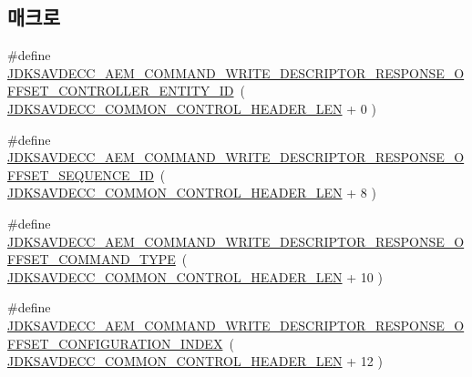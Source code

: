 \subsection*{매크로}
\begin{DoxyCompactItemize}
\item 
\#define \hyperlink{group__command__write__descriptor__response_ga296ac8670b1161795dd8e58f2487ce47}{J\+D\+K\+S\+A\+V\+D\+E\+C\+C\+\_\+\+A\+E\+M\+\_\+\+C\+O\+M\+M\+A\+N\+D\+\_\+\+W\+R\+I\+T\+E\+\_\+\+D\+E\+S\+C\+R\+I\+P\+T\+O\+R\+\_\+\+R\+E\+S\+P\+O\+N\+S\+E\+\_\+\+O\+F\+F\+S\+E\+T\+\_\+\+C\+O\+N\+T\+R\+O\+L\+L\+E\+R\+\_\+\+E\+N\+T\+I\+T\+Y\+\_\+\+ID}~( \hyperlink{group__jdksavdecc__avtp__common__control__header_gaae84052886fb1bb42f3bc5f85b741dff}{J\+D\+K\+S\+A\+V\+D\+E\+C\+C\+\_\+\+C\+O\+M\+M\+O\+N\+\_\+\+C\+O\+N\+T\+R\+O\+L\+\_\+\+H\+E\+A\+D\+E\+R\+\_\+\+L\+EN} + 0 )
\item 
\#define \hyperlink{group__command__write__descriptor__response_ga1efe749ef7215923b2504f3e46a7bbae}{J\+D\+K\+S\+A\+V\+D\+E\+C\+C\+\_\+\+A\+E\+M\+\_\+\+C\+O\+M\+M\+A\+N\+D\+\_\+\+W\+R\+I\+T\+E\+\_\+\+D\+E\+S\+C\+R\+I\+P\+T\+O\+R\+\_\+\+R\+E\+S\+P\+O\+N\+S\+E\+\_\+\+O\+F\+F\+S\+E\+T\+\_\+\+S\+E\+Q\+U\+E\+N\+C\+E\+\_\+\+ID}~( \hyperlink{group__jdksavdecc__avtp__common__control__header_gaae84052886fb1bb42f3bc5f85b741dff}{J\+D\+K\+S\+A\+V\+D\+E\+C\+C\+\_\+\+C\+O\+M\+M\+O\+N\+\_\+\+C\+O\+N\+T\+R\+O\+L\+\_\+\+H\+E\+A\+D\+E\+R\+\_\+\+L\+EN} + 8 )
\item 
\#define \hyperlink{group__command__write__descriptor__response_gafbe0f6da724d9bbb958a2ca76483ef35}{J\+D\+K\+S\+A\+V\+D\+E\+C\+C\+\_\+\+A\+E\+M\+\_\+\+C\+O\+M\+M\+A\+N\+D\+\_\+\+W\+R\+I\+T\+E\+\_\+\+D\+E\+S\+C\+R\+I\+P\+T\+O\+R\+\_\+\+R\+E\+S\+P\+O\+N\+S\+E\+\_\+\+O\+F\+F\+S\+E\+T\+\_\+\+C\+O\+M\+M\+A\+N\+D\+\_\+\+T\+Y\+PE}~( \hyperlink{group__jdksavdecc__avtp__common__control__header_gaae84052886fb1bb42f3bc5f85b741dff}{J\+D\+K\+S\+A\+V\+D\+E\+C\+C\+\_\+\+C\+O\+M\+M\+O\+N\+\_\+\+C\+O\+N\+T\+R\+O\+L\+\_\+\+H\+E\+A\+D\+E\+R\+\_\+\+L\+EN} + 10 )
\item 
\#define \hyperlink{group__command__write__descriptor__response_ga80fc7b65d2f62340e64a385ac29b6fff}{J\+D\+K\+S\+A\+V\+D\+E\+C\+C\+\_\+\+A\+E\+M\+\_\+\+C\+O\+M\+M\+A\+N\+D\+\_\+\+W\+R\+I\+T\+E\+\_\+\+D\+E\+S\+C\+R\+I\+P\+T\+O\+R\+\_\+\+R\+E\+S\+P\+O\+N\+S\+E\+\_\+\+O\+F\+F\+S\+E\+T\+\_\+\+C\+O\+N\+F\+I\+G\+U\+R\+A\+T\+I\+O\+N\+\_\+\+I\+N\+D\+EX}~( \hyperlink{group__jdksavdecc__avtp__common__control__header_gaae84052886fb1bb42f3bc5f85b741dff}{J\+D\+K\+S\+A\+V\+D\+E\+C\+C\+\_\+\+C\+O\+M\+M\+O\+N\+\_\+\+C\+O\+N\+T\+R\+O\+L\+\_\+\+H\+E\+A\+D\+E\+R\+\_\+\+L\+EN} + 12 )

\end{DoxyCompactItemize}
